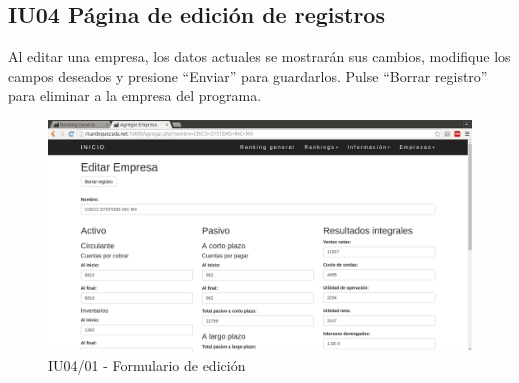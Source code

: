 \hypertarget{IU04}{\subsection{IU04 Página de edición de registros}}

    Al editar una empresa, los datos actuales se mostrarán sus cambios,
    modifique los campos deseados y presione ``Enviar'' para guardarlos.
    Pulse ``Borrar registro'' para eliminar a la empresa del programa.

    \begin{figure}[H]
        \begin{center}
            \includegraphics[scale=0.3]{pantallas/Editar1}
            \caption{IU04/01 - Formulario de edición}
        \end{center}
    \end{figure}
